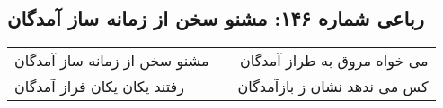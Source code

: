 \begin{center}
\section*{رباعی شماره ۱۴۶: مشنو سخن از زمانه ساز آمدگان}
\label{sec:sh146}
\begin{longtable}{l p{0.5cm} r}
مشنو سخن از زمانه ساز آمدگان
&&
می خواه مروق به طراز آمدگان
\\
رفتند یکان یکان فراز آمدگان
&&
کس می ندهد نشان ز بازآمدگان
\\
\end{longtable}
\end{center}
